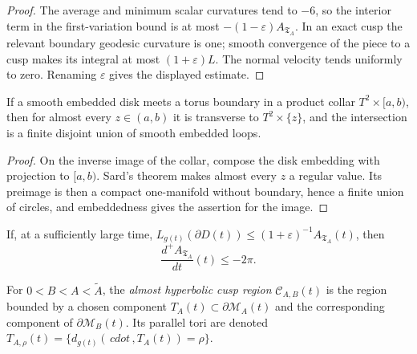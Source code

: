\begin{proof}
\sketch
The average and minimum scalar curvatures tend to \(-6\), so the interior term
in the first-variation bound is at most
\(-(1-\varepsilon)A_{\mathfrak T_A}\).  In an exact cusp the relevant boundary
geodesic curvature is one; smooth convergence of the piece to a cusp makes its
integral at most \((1+\varepsilon)L\).  The normal velocity tends uniformly to
zero.  Renaming \(\varepsilon\) gives the displayed estimate.
\end{proof}

\begin{lemma}
\label{lem:chow-iv-disk-torus-slice-transversality}
If a smooth embedded disk meets a torus boundary in a product collar
\(T^2\times[a,b)\), then for almost every \(z\in(a,b)\) it is transverse to
\(T^2\times\{z\}\), and the intersection is a finite disjoint union of smooth
embedded loops.
\end{lemma}

\begin{proof}
\sketch
On the inverse image of the collar, compose the disk embedding with projection
to \([a,b)\).  Sard's theorem makes almost every \(z\) a regular value.  Its
preimage is then a compact one-manifold without boundary, hence a finite union
of circles, and embeddedness gives the assertion for the image.
\end{proof}

\begin{lemma}
\label{lem:chow-iv-area-decay-short-boundary}
If, at a sufficiently large time,
\(L_{g(t)}(\partial D(t))\le(1+\varepsilon)^{-1}A_{\mathfrak T_A}(t)\), then
\[
 \frac{d^+A_{\mathfrak T_A}}{dt}(t)\le-2\pi.
\]
\end{lemma}

\begin{definition}
\label{def:chow-iv-almost-hyperbolic-cusp-region}
For \(0<B<A<\widetilde A\), the \emph{almost hyperbolic cusp region}
\(\mathcal C_{A,B}(t)\) is the region bounded by a chosen component
\(T_A(t)\subset\partial\mathcal M_A(t)\) and the corresponding component of
\(\partial\mathcal M_B(t)\).  Its parallel tori are denoted
\(T_{A,\rho}(t)=\{d_{g(t)}(\,cdot\,,T_A(t))=\rho\}\).
\end{definition}

